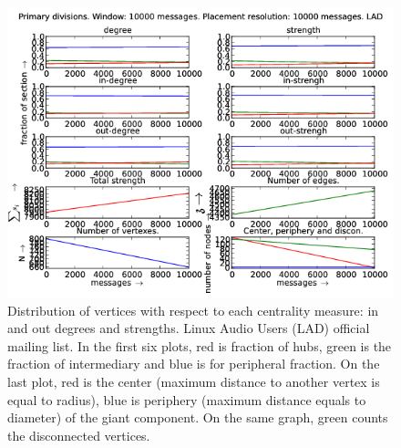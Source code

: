 \documentclass[%
 aip,
 jmp,%
 amsmath,amssymb,
 reprint,%
]{revtex4-1}
\begin{document}
\begin{figure}[hbtp] 
   \centering
        \includegraphics[width=\textwidth]{figs/LAD/10000}
    \caption{Distribution of vertices with respect to each centrality measure: in and out degrees and strengths. Linux Audio Users (LAD) official mailing list. In the first six plots, red is fraction of hubs, green is the fraction of intermediary and blue is for peripheral fraction. On the last plot, red is the center (maximum distance to another vertex is equal to radius), blue is periphery (maximum distance equals to diameter) of the giant component. On the same graph, green counts the disconnected vertices.}
    \label{fig:lad10000}
\end{figure}
\end{document}
